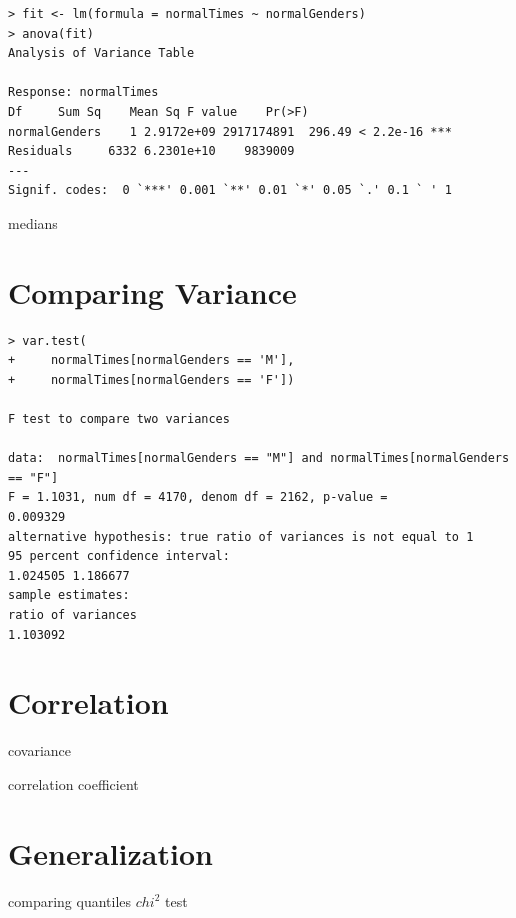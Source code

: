 \documentclass{tufte-book} %
\begin{document}
\begin{Verbatim}
> fit <- lm(formula = normalTimes ~ normalGenders)
> anova(fit)
Analysis of Variance Table

Response: normalTimes
Df     Sum Sq    Mean Sq F value    Pr(>F)    
normalGenders    1 2.9172e+09 2917174891  296.49 < 2.2e-16 ***
Residuals     6332 6.2301e+10    9839009                      
---
Signif. codes:  0 `***' 0.001 `**' 0.01 `*' 0.05 `.' 0.1 ` ' 1
\end{Verbatim}

medians


\section{Comparing Variance}
\begin{Verbatim}
> var.test(
+     normalTimes[normalGenders == 'M'], 
+     normalTimes[normalGenders == 'F'])

F test to compare two variances

data:  normalTimes[normalGenders == "M"] and normalTimes[normalGenders == "F"]
F = 1.1031, num df = 4170, denom df = 2162, p-value =
0.009329
alternative hypothesis: true ratio of variances is not equal to 1
95 percent confidence interval:
1.024505 1.186677
sample estimates:
ratio of variances 
1.103092 
\end{Verbatim}


\section{Correlation}
covariance

correlation coefficient

\section{Generalization}
comparing quantiles
$chi^2$ test
\end{document}
